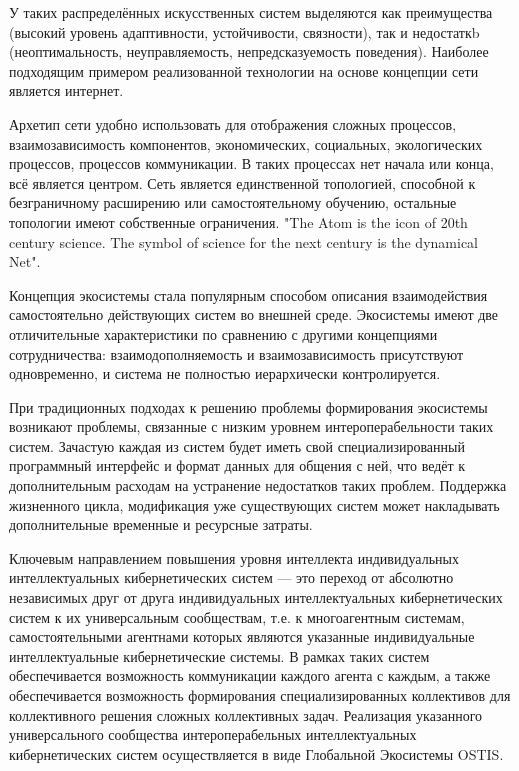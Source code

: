У таких распределённых искусственных систем выделяются как преимущества (высокий уровень адаптивности, устойчивости, связности), так и недостаткb (неоптимальность, неуправляемость, непредсказуемость поведения). Наиболее подходящим примером реализованной технологии на основе концепции сети является интернет.

Архетип сети удобно использовать для отображения сложных процессов, взаимозависимость компонентов, экономических, социальных, экологических процессов, процессов коммуникации. В таких процессах нет начала или конца, всё является центром. Сеть является единственной топологией, способной к безграничному расширению или самостоятельному обучению, остальные топологии имеют собственные ограничения. "The Atom is the icon of 20th century science. The symbol of science for the next century is the dynamical Net"{}.

Концепция экосистемы стала популярным способом описания взаимодействия самостоятельно действующих систем во внешней среде. 
Экосистемы имеют две отличительные характеристики по сравнению с другими концепциями сотрудничества: взаимодополняемость и взаимозависимость присутствуют одновременно, и система не полностью иерархически контролируется.

При традиционных подходах к решению проблемы формирования экосистемы возникают проблемы, связанные с низким уровнем интероперабельности таких систем.
Зачастую каждая из систем будет иметь свой специализированный программный интерфейс и формат данных для общения с ней, что ведёт к дополнительным расходам на устранение недостатков таких проблем. Поддержка жизненного цикла, модификация уже существующих систем может накладывать дополнительные временные и ресурсные затраты. 

Ключевым направлением повышения уровня интеллекта индивидуальных интеллектуальных кибернетических систем --- это переход от абсолютно независимых друг от друга индивидуальных интеллектуальных кибернетических систем к их универсальным сообществам, т.е. к многоагентным системам, самостоятельными агентнами которых являются указанные индивидуальные интеллектуальные кибернетические системы.
В рамках таких систем обеспечивается возможность коммуникации каждого агента с каждым, а также обеспечивается возможность формирования специализированных коллективов для коллективного решения сложных коллективных задач.
Реализация указанного универсального сообщества интероперабельных интеллектуальных кибернетических систем осуществляется в виде Глобальной Экосистемы OSTIS. 








%